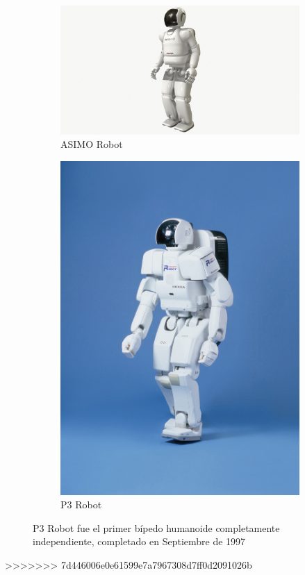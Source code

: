 \begin{figure}[H]
	\centering
	\begin{subfigure}[b]{0.5\textwidth}
		\centering
		\includegraphics[width=\textwidth]{images/ASIMO.jpg}
		\caption{ASIMO Robot}
		\label{fig:image1}
	\end{subfigure}
	\hfill
	\begin{subfigure}[b]{0.24\textwidth}
		\centering
		\includegraphics[width=\textwidth]{images/P3_robot.jpg}
		\caption{P3 Robot}
		\label{fig:image2}
	\end{subfigure}
	\caption{P3 Robot fue el primer bípedo humanoide completamente independiente, completado en Septiembre de 1997}
	\label{fig:parallel_images}
\end{figure}
>>>>>>> 7d446006e0e61599e7a7967308d7ff0d2091026b

